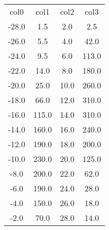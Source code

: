 \begin{table}
\begin{tabular}{cccc}
col0 & col1 & col2 & col3 \\
-28.0 & 1.5 & 2.0 & 2.5 \\
-26.0 & 5.5 & 4.0 & 42.0 \\
-24.0 & 9.5 & 6.0 & 113.0 \\
-22.0 & 14.0 & 8.0 & 180.0 \\
-20.0 & 25.0 & 10.0 & 260.0 \\
-18.0 & 66.0 & 12.0 & 310.0 \\
-16.0 & 115.0 & 14.0 & 310.0 \\
-14.0 & 160.0 & 16.0 & 240.0 \\
-12.0 & 190.0 & 18.0 & 200.0 \\
-10.0 & 230.0 & 20.0 & 125.0 \\
-8.0 & 200.0 & 22.0 & 62.0 \\
-6.0 & 190.0 & 24.0 & 28.0 \\
-4.0 & 150.0 & 26.0 & 18.0 \\
-2.0 & 70.0 & 28.0 & 14.0 \\
\end{tabular}
\end{table}
